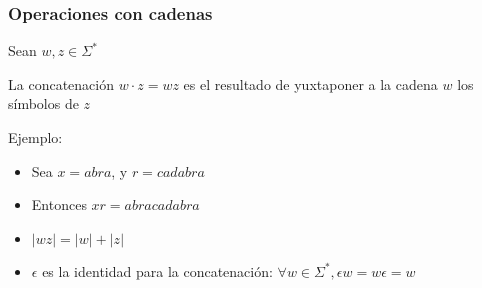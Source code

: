 \begin{frame}
  \frametitle{Operaciones con cadenas}
	   Sean $w, z \in \Sigma^*$
      \begin{defi}
			La concatenación $w \cdot z = wz$ es el resultado de yuxtaponer a la cadena $w$ los símbolos de $z$
      \end{defi}

      \pause
      \begin{block}{Ejemplo:}
           \begin{itemize}[<+->]
           \item Sea $x =abra$, y $r = cadabra$
           \item Entonces $xr = abracadabra$
           \end{itemize}
      \end{block}

      \pause
			\begin{block}{}
           \begin{itemize}[<+->]
           \item $|wz| = |w| + |z|$
           \item $\epsilon$ es la identidad para la concatenación: $\forall w \in \Sigma^*, \epsilon w = w \epsilon = w$
           \end{itemize}
			\end{block}

\end{frame}
